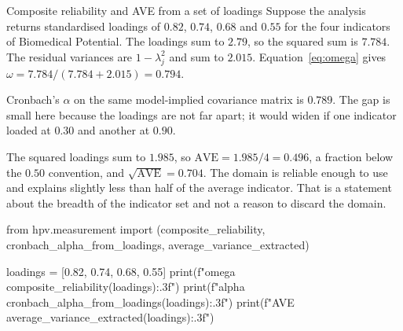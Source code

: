 \begin{workedexample}{Composite reliability and AVE from a set of loadings}
Suppose the analysis returns standardised loadings of $0.82$, $0.74$, $0.68$
and $0.55$ for the four indicators of Biomedical Potential. The loadings sum
to $2.79$, so the squared sum is $7.784$. The residual variances are
$1-\lambda_j^{2}$ and sum to $2.015$. Equation~\eqref{eq:omega} gives
$\omega=7.784/(7.784+2.015)=0.794$.

Cronbach's $\alpha$ on the same model-implied covariance matrix is $0.789$.
The gap is small here because the loadings are not far apart; it would widen
if one indicator loaded at $0.30$ and another at $0.90$.

The squared loadings sum to $1.985$, so $\mathrm{AVE}=1.985/4=0.496$, a
fraction below the $0.50$ convention, and $\sqrt{\mathrm{AVE}}=0.704$. The
domain is reliable enough to use and explains slightly less than half of the
average indicator. That is a statement about the breadth of the indicator set
and not a reason to discard the domain.

\begin{wecode}[Python]
from hpv.measurement import (composite_reliability,
                             cronbach_alpha_from_loadings,
                             average_variance_extracted)

loadings = [0.82, 0.74, 0.68, 0.55]
print(f"omega {composite_reliability(loadings):.3f}")
print(f"alpha {cronbach_alpha_from_loadings(loadings):.3f}")
print(f"AVE   {average_variance_extracted(loadings):.3f}")
\end{wecode}

\end{workedexample}

